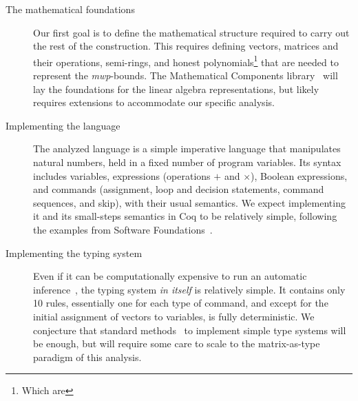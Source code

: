 \documentclass[sigplan,screen,timestamp,%
nonacm]{acmart}
\begin{document}
\begin{description}
	\item[The mathematical foundations]
		Our first goal is to define the mathematical structure required to carry out the rest of the construction.
        This requires defining vectors, matrices and their operations, semi-rings, and honest polynomials\footnote{Which are } that are
        needed to represent the \emph{mwp}-bounds.
        The Mathematical Components library~\cite{mathcomp} will lay the foundations for the linear algebra representations,
        but likely requires extensions to accommodate our specific analysis.

	\item[Implementing the language]
        The analyzed language is a simple imperative language that manipulates natural numbers,
        held in a fixed number of program variables. Its syntax includes
        variables, expressions (operations $+$ and $\times$), Boolean expressions, and commands (\eg  assignment, loop and decision statements, command sequences, and skip), with their usual semantics.
        We expect implementing it and its small-steps semantics in Coq to be relatively simple,
        following the examples from Software Foundations~\cite{softwarefoundation1,softwarefoundation2}.

	\item[Implementing the typing system]
		Even if it can be computationally expensive to run an automatic inference~\cite{Aubert2022l}, the typing system \emph{in itself} is relatively simple.
		It contains only 10 rules, essentially one for each type of command, and except for the initial assignment of vectors to variables, is fully deterministic.
		We conjecture that standard methods~\cite{Chiapala2022, Chlipala2010} to implement simple type systems will be enough, but will require some care to scale to the matrix-as-type paradigm of this analysis.	
	

\end{description}
\end{document}
